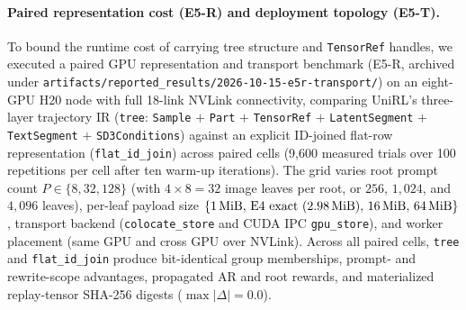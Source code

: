 \documentclass[10pt]{article}
\newcommand{\sample}{\texttt{Sample}}
\newcommand{\parttype}{\texttt{Part}}
\newcommand{\codepath}[1]{\texttt{#1}}
\begin{document}
\paragraph{Paired representation cost (E5-R) and deployment topology (E5-T).}
To bound the runtime cost of carrying tree structure and \texttt{TensorRef} handles, we executed a paired GPU representation and transport benchmark (E5-R, archived under \codepath{artifacts/reported\_results/2026-10-15-e5r-transport/}) on an eight-GPU H20 node with full 18-link NVLink connectivity, comparing UniRL's three-layer trajectory IR (\texttt{tree}: \sample{} $+$ \parttype{} $+$ \texttt{TensorRef} $+$ \texttt{LatentSegment} $+$ \texttt{TextSegment} $+$ \texttt{SD3Conditions}) against an explicit ID-joined flat-row representation (\texttt{flat\_id\_join}) across \EFiveRPairedCells{} paired cells (9,600 measured trials over 100 repetitions per cell after ten warm-up iterations).
The grid varies root prompt count $P \in \{8, 32, 128\}$ (with $4\times8=32$ image leaves per root, or $256$, $1{,}024$, and $4{,}096$ leaves), per-leaf payload size $\{1\text{\,MiB},\, \text{E4 exact } (2.98\text{\,MiB}),\, 16\text{\,MiB},\, 64\text{\,MiB}\}$, transport backend (\texttt{colocate\_store} and CUDA IPC \texttt{gpu\_store}), and worker placement (same GPU and cross GPU over NVLink).
Across all \EFiveRPairedCells{} paired cells, \texttt{tree} and \texttt{flat\_id\_join} produce bit-identical group memberships, prompt- and rewrite-scope advantages, propagated AR and root rewards, and materialized replay-tensor SHA-256 digests ($\max|\Delta| = 0.0$).
\end{document}
